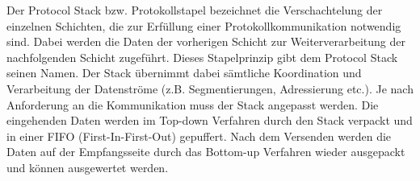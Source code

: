 Der Protocol Stack bzw. Protokollstapel bezeichnet die Verschachtelung der
einzelnen Schichten, die zur Erf{\"u}llung einer Protokollkommunikation
notwendig sind. Dabei werden die Daten der vorherigen Schicht zur
Weiterverarbeitung der nachfolgenden Schicht zugef{\"u}hrt. Dieses Stapelprinzip
gibt dem Protocol Stack seinen Namen. Der Stack {\"u}bernimmt dabei
s{\"a}mtliche Koordination und Verarbeitung der Datenstr{\"o}me (z.B.
Segmentierungen, Adressierung etc.).
Je nach Anforderung an die Kommunikation muss der Stack angepasst werden. Die
eingehenden Daten werden im Top-down Verfahren durch den Stack verpackt
und in einer FIFO (First-In-First-Out) gepuffert. Nach dem Versenden werden die
Daten auf der Empfangsseite durch das Bottom-up Verfahren wieder ausgepackt und k{\"o}nnen
ausgewertet werden.
